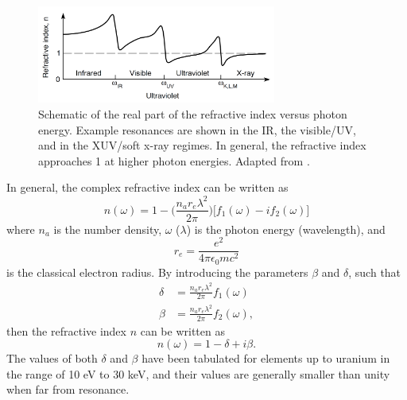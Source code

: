 \begin{figure}
	\centering
	\includegraphics[width=0.7\textwidth]{figures/refractive_index/attwood_real_n_schematic.png}
	\caption[Schematic of real part of the refractive index from infrared to X-ray wavelengths]{Schematic of the real part of the refractive index versus photon energy. Example resonances are shown in the IR, the visible/UV, and in the XUV/soft x-ray regimes. In general, the refractive index approaches 1 at higher photon energies.  Adapted from \cite{attwoodSoftXraysExtreme2000}.}
	\label{fig:refractive_index_schematic}
\end{figure}

In general, the complex refractive index can be written as\cite{attwoodSoftXraysExtreme2000}
\begin{equation}
\label{eqn:refractive_index}
	n(\omega)=1 - \bigg(\frac{n_a r_e \lambda^2}{2\pi}\bigg)\bigg[f_1(\omega) - i f_2(\omega)\bigg]
\end{equation}
where $n_a$ is the number density, $\omega$ ($\lambda$) is the photon energy (wavelength), and
\begin{equation}
\label{eqn:r_e}
	r_e = \frac{e^2}{4\pi\epsilon_0 mc^2}
\end{equation}
is the classical electron radius. By introducing the parameters $\beta$ and $\delta$, such that
\begin{equation}
\label{eqn:delta_beta_def}
	\begin{aligned}
	\delta &= \frac{n_a r_e \lambda^2}{2\pi}f_1(\omega)\\
	\beta & = \frac{n_a r_e \lambda^2}{2\pi}f_2(\omega),
	\end{aligned}
\end{equation}
then the refractive index $n$ can be written as
\begin{equation}
\label{eqn:refractive_index_db}
	n(\omega)=1-\delta+i\beta.
\end{equation}
The values of both $\delta$ and $\beta$ have been tabulated for elements up to uranium in the range of 10 eV to 30 keV\cite{henkeLowenergyXrayInteraction1982}, and their values are generally smaller than unity when far from resonance.

